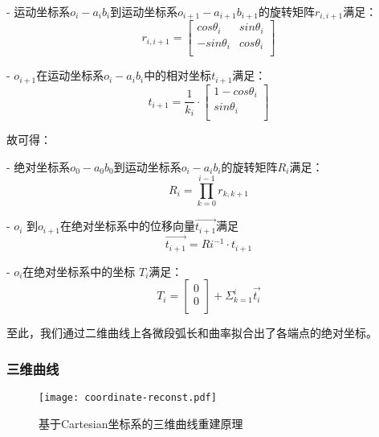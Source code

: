 - 运动坐标系$o_i-a_ib_i$到运动坐标系$o_{i+1}-a_{i+1}b_{i+1}$的旋转矩阵$r_{i, i+1}$满足：
    \begin{equation}
    r_{i, i+1} = \left[
      \begin{matrix}
      cos \theta_i & sin \theta_i\\
      -sin \theta_i & cos \theta_i\\
      \end{matrix}
    \right]
    \end{equation}
    
- $o_{i+1}$在运动坐标系$o_i-a_ib_i$中的相对坐标$t_{i+1}$满足：
    \begin{equation}
    t_{i+1} = \frac{1}{k_i} \cdot \left[
      \begin{matrix}
    	1 - cos\theta_i\\
      sin\theta_i\\
      \end{matrix}
    \right]
    \end{equation}
    

故可得：

- 绝对坐标系$o_0-a_0b_0$到运动坐标系$o_i-a_ib_i$的旋转矩阵$R_i$满足：
    \begin{equation}
    R_i = \prod_{k = 0}^{i-1} r_{k, k+1}
    \end{equation}

- $o_i$ 到$o_{i+1}$在绝对坐标系中的位移向量$\vec{t_{i+1}}$满足
    \begin{equation}
    \vec{t_{i+1}} = Ri^{-1}\cdot t_{i+1}
    \end{equation}
    
- $o_i$在绝对坐标系中的坐标 $T_i$满足：
    \begin{equation}
    T_i = \left[
    		\begin{matrix}
        0\\
        0\\
      	\end{matrix}
      \right]
      + \Sigma_{k=1} ^ {i} \vec{t_i}
    \end{equation}
    
至此，我们通过二维曲线上各微段弧长和曲率拟合出了各端点的绝对坐标。

\subsubsection{三维曲线}

\begin{figure}
\centering
\texttt{[image: coordinate-reconst.pdf]}
\caption{基于Cartesian坐标系的三维曲线重建原理}
\label{fig:coordinate-reconst} 
\end{figure}


